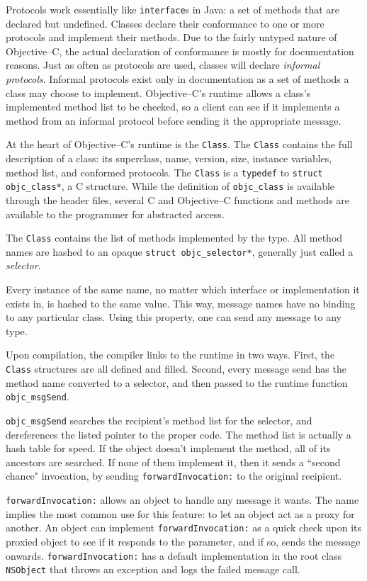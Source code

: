 Protocols work essentially like \texttt{interface}s in Java: a set of methods
that are declared but undefined. Classes declare their conformance to one or
more protocols and implement their methods. Due to the fairly untyped nature
of Objective--C, the actual declaration of conformance is mostly for
documentation reasons. Just as often as protocols are used, classes will
declare \emph{informal protocols}. Informal protocols exist only in
documentation as a set of methods a class may choose to implement.
Objective--C's runtime allows a class's implemented method list to be checked,
so a client can see if it implements a method from an informal protocol before
sending it the appropriate message.

At the heart of Objective--C's runtime is the \texttt{Class}. The
\texttt{Class} contains the full description of a class: its superclass, name,
version, size, instance variables, method list, and conformed protocols. The
\texttt{Class} is a \texttt{typedef} to \texttt{struct objc\_class*}, a C
structure. While the definition of \texttt{objc\_class} is available through
the header files, several C and Objective--C functions and methods are
available to the programmer for abstracted access.

The \texttt{Class} contains the list of methods implemented by the type. All
method names are hashed to an opaque \texttt{struct objc\_selector*},
generally just called a \emph{selector}.

Every instance of the same name, no matter which interface or implementation
it exists in, is hashed to the same value. This way, message names have no
binding to any particular class. Using this property, one can send any message
to any type.

Upon compilation, the compiler links to the runtime in two ways. First, the
\texttt{Class} structures are all defined and filled. Second, every message
send has the method name converted to a selector, and then passed to the
runtime function \texttt{objc\_msgSend}.

\texttt{objc\_msgSend} searches the recipient's method list for the selector,
and dereferences the listed pointer to the proper code. The method list is
actually a hash table for speed. If the object doesn't implement the method,
all of its ancestors are searched. If none of them implement it, then it sends
a ``second chance" invocation, by sending \texttt{forwardInvocation:} to the
original recipient.

\texttt{forwardInvocation:} allows an object to handle any message it wants.
The name implies the most common use for this feature: to let an object act as
a proxy for another. An object can implement \texttt{forwardInvocation:} as a
quick check upon its proxied object to see if it responds to the parameter,
and if so, sends the message onwards. \texttt{forwardInvocation:} has a
default implementation in the root class \texttt{NSObject} that throws an
exception and logs the failed message call.

